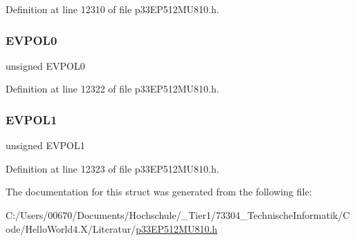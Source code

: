Definition at line 12310 of file p33\+E\+P512\+M\+U810.\+h.

\mbox{\label{structtag_c_m1_c_o_n_b_i_t_s_ab8a5977706a1608b0e9a1a91b9d3b3e3}} 
\subsubsection{\texorpdfstring{E\+V\+P\+O\+L0}{EVPOL0}}
{\footnotesize\ttfamily unsigned E\+V\+P\+O\+L0}



Definition at line 12322 of file p33\+E\+P512\+M\+U810.\+h.

\mbox{\label{structtag_c_m1_c_o_n_b_i_t_s_a0254aea1902c8c590f6753fefd1d8875}} 
\subsubsection{\texorpdfstring{E\+V\+P\+O\+L1}{EVPOL1}}
{\footnotesize\ttfamily unsigned E\+V\+P\+O\+L1}



Definition at line 12323 of file p33\+E\+P512\+M\+U810.\+h.



The documentation for this struct was generated from the following file\+:\begin{DoxyCompactItemize}
\item 
C\+:/\+Users/00670/\+Documents/\+Hochschule/\+\_\+\+Tier1/73304\+\_\+\+Technische\+Informatik/\+Code/\+Hello\+World4.\+X/\+Literatur/\hyperlink{p33_e_p512_m_u810_8h}{p33\+E\+P512\+M\+U810.\+h}\end{DoxyCompactItemize}
